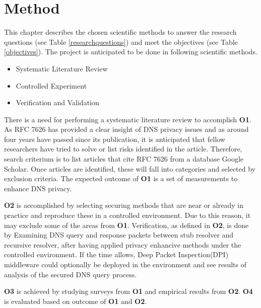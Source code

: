 \documentclass[a4paper,12pt]{article}
\begin{document}
\section{Method}
\label{Method}
This chapter describes the chosen scientific methods to answer the research questions (see Table \ref{researchquestions}) and meet the objectives (see Table \ref{objectives}).
The project is anticipated to be done in following scientific methods.
\begin{itemize}
\item Systematic Literature Review
\item Controlled Experiment
\item Verification and Validation
\end{itemize}
There is a need for performing a systematic literature review to accomplish \textbf{O1}. As RFC 7626\cite{rfc7626} has provided a clear insight of DNS privacy issues and as around four years have passed since its publication, it is anticipated that fellow researchers have tried to solve or list risks identified in the article.
Therefore, search criterium is to list articles that cite RFC 7626 from a database Google Scholar. Once articles are identified, these will fall into categories and selected by exclusion criteria.
The expected outcome of \textbf{O1} is a set of measurements to enhance DNS privacy.

\textbf{O2} is accomplished by selecting securing methods that are near or already in practice and reproduce these in a controlled environment. Due to this reason, it may exclude some of the areas from \textbf{O1}. Verification, as defined in \textbf{O2}, is done by Examining DNS query and response packets between stub resolver and recursive resolver, after having applied privacy enhancive methods under the controlled environment. If the time allows, Deep Packet Inspection(DPI) middleware could optionally be deployed in the environment and see results of analysis of the secured DNS query process.

\textbf{O3} is achieved by studying surveys from \textbf{O1} and empirical results from \textbf{O2}. \textbf{O4} is evaluated based on outcome of \textbf{O1} and \textbf{O2}.
\end{document}
